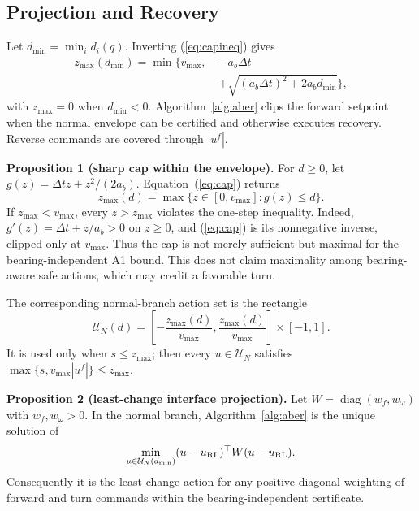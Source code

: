 \documentclass[letterpaper]{article}
\begin{document}
\subsection{Projection and Recovery}

Let $d_{\min}=\min_i d_i(q)$.  Inverting (\ref{eq:capineq}) gives
\begin{equation}
\begin{aligned}
z_{\max}(d_{\min})=\min\{v_{\max},\;&-a_b\Delta t\\
 &+\sqrt{(a_b\Delta t)^2+2a_bd_{\min}}\},
\end{aligned}                                                   \label{eq:cap}
\end{equation}
with $z_{\max}=0$ when $d_{\min}<0$.  Algorithm~\ref{alg:aber} clips the
forward setpoint when the normal envelope can be certified and otherwise
executes recovery.  Reverse commands are covered through $|u^f|$.

\textbf{Proposition 1 (sharp cap within the envelope).}
For $d\ge0$, let $g(z)=\Delta t z+z^2/(2a_b)$.  Equation~(\ref{eq:cap})
returns
\[
 z_{\max}(d)=\max\{z\in[0,v_{\max}]:g(z)\le d\}.
\]
If $z_{\max}<v_{\max}$, every $z>z_{\max}$ violates the one-step
inequality.  Indeed, $g'(z)=\Delta t+z/a_b>0$ on $z\ge0$, and
(\ref{eq:cap}) is its nonnegative inverse, clipped only at $v_{\max}$.
Thus the cap is not merely sufficient but maximal for the
bearing-independent A1 bound.  This does not claim maximality among
bearing-aware safe actions, which may credit a favorable turn.

The corresponding normal-branch action set is the rectangle
\begin{equation}
 \mathcal U_N(d)=
 \left[-\frac{z_{\max}(d)}{v_{\max}},
        \frac{z_{\max}(d)}{v_{\max}}\right]\times[-1,1]. \label{eq:normalset}
\end{equation}
It is used only when $s\le z_{\max}$; then every $u\in\mathcal U_N$ satisfies
$\max\{s,v_{\max}|u^f|\}\le z_{\max}$.

\textbf{Proposition 2 (least-change interface projection).}
Let $W=\operatorname{diag}(w_f,w_\omega)$ with $w_f,w_\omega>0$.  In the
normal branch, Algorithm~\ref{alg:aber} is the unique solution of
\begin{equation}
 \min_{u\in\mathcal U_N(d_{\min})}
       (u-u_{\rm RL})^\top W(u-u_{\rm RL}).             \label{eq:weightedproj}
\end{equation}
Consequently it is the least-change action for any positive diagonal weighting
of forward and turn commands within the bearing-independent certificate.
\end{document}
